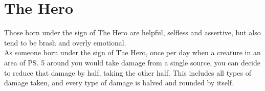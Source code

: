 \section{The Hero}\label{zodiac:hero}

Those born under the sign of The Hero are helpful, selfless and assertive, but also tend to be brash and overly emotional.\\
As someone born under the sign of The Hero, once per day when a creature in an area of \ps{5} around you would take damage from a single source, you can decide to reduce that damage by half, taking the other half.
This includes all types of damage taken, and every type of damage is halved and rounded by itself.\\